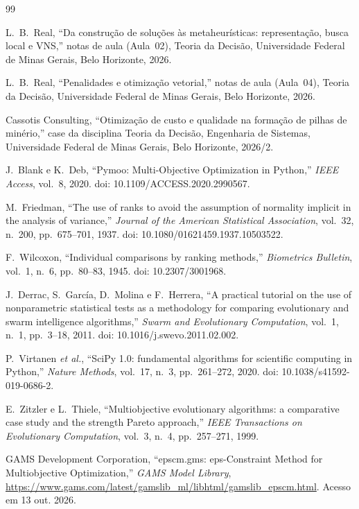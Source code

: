 \documentclass[conference]{IEEEtran}
\begin{document}
\begin{thebibliography}{99}

L.~B.~Real, ``Da construção de soluções às metaheurísticas: representação, busca local e VNS,'' notas de aula (Aula~02), Teoria da Decisão, Universidade Federal de Minas Gerais, Belo Horizonte, 2026.

L.~B.~Real, ``Penalidades e otimização vetorial,'' notas de aula (Aula~04), Teoria da Decisão, Universidade Federal de Minas Gerais, Belo Horizonte, 2026.

Cassotis Consulting, ``Otimização de custo e qualidade na formação de pilhas de minério,'' case da disciplina Teoria da Decisão, Engenharia de Sistemas, Universidade Federal de Minas Gerais, Belo Horizonte, 2026/2.

J.~Blank e K.~Deb, ``Pymoo: Multi-Objective Optimization in Python,''
\textit{IEEE Access}, vol.~8, 2020. doi: 10.1109/ACCESS.2020.2990567.

M.~Friedman, ``The use of ranks to avoid the assumption of normality implicit
in the analysis of variance,'' \textit{Journal of the American Statistical
Association}, vol.~32, n.~200, pp.~675--701, 1937.
doi: 10.1080/01621459.1937.10503522.

F.~Wilcoxon, ``Individual comparisons by ranking methods,''
\textit{Biometrics Bulletin}, vol.~1, n.~6, pp.~80--83, 1945.
doi: 10.2307/3001968.

J.~Derrac, S.~García, D.~Molina e F.~Herrera, ``A practical tutorial on the use
of nonparametric statistical tests as a methodology for comparing evolutionary
and swarm intelligence algorithms,'' \textit{Swarm and Evolutionary
Computation}, vol.~1, n.~1, pp.~3--18, 2011. doi: 10.1016/j.swevo.2011.02.002.

P.~Virtanen \textit{et al.}, ``SciPy 1.0: fundamental algorithms for scientific
computing in Python,'' \textit{Nature Methods}, vol.~17, n.~3, pp.~261--272,
2020. doi: 10.1038/s41592-019-0686-2.

E.~Zitzler e L.~Thiele, ``Multiobjective evolutionary algorithms: a comparative
case study and the strength Pareto approach,'' \textit{IEEE Transactions on
Evolutionary Computation}, vol.~3, n.~4, pp.~257--271, 1999.

GAMS Development Corporation, ``epscm.gms: eps-Constraint Method for
Multiobjective Optimization,'' \textit{GAMS Model Library},
\url{https://www.gams.com/latest/gamslib_ml/libhtml/gamslib_epscm.html}.
Acesso em 13 out. 2026.


\end{thebibliography}
\end{document}
